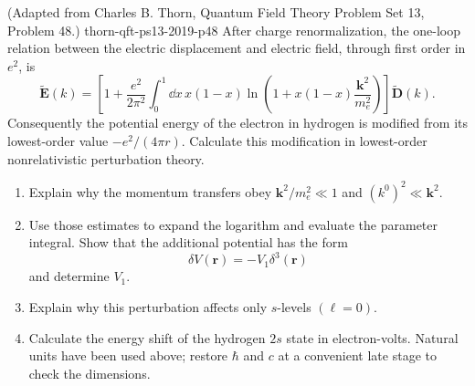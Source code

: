 \begin{enumerate}
  {(Adapted from Charles B. Thorn, Quantum Field Theory Problem Set 13, Problem 48.)}
  {thorn-qft-ps13-2019-p48}
After charge renormalization, the one-loop relation between the electric
displacement and electric field, through first order in \(e^2\), is
\[
 \widetilde{\mathbf E}(k)=
 \left[
 1+\frac{e^2}{2\pi^2}\int_0^1\dd x\,x(1-x)
 \ln\!\left(1+x(1-x)\frac{\mathbf k^2}{m_e^2}\right)
 \right]\widetilde{\mathbf D}(k).
\]
Consequently the potential energy of the electron in hydrogen is
modified from its lowest-order value \(-e^2/(4\pi r)\).  Calculate this
modification in lowest-order nonrelativistic perturbation theory.
\begin{enumerate}
\item
Explain why the momentum transfers obey
\(\mathbf k^2/m_e^2\ll1\) and
\((k^0)^2\ll\mathbf k^2\).
\item
Use those estimates to expand the logarithm and evaluate the parameter
integral.  Show that the additional potential has the form
\[
 \delta V(\mathbf r)=-V_1\delta^3(\mathbf r)
\]
and determine \(V_1\).
\item
Explain why this perturbation affects only \(s\)-levels
\((\ell=0)\).
\item
Calculate the energy shift of the hydrogen \(2s\) state in
electron-volts.  Natural units have been used above; restore
\(\hbar\) and \(c\) at a convenient late stage to check the dimensions.
\end{enumerate}


\end{enumerate}
